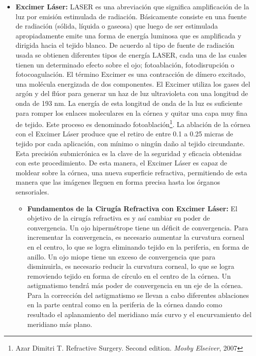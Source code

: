 \begin{itemize}
\begin{enumerate}
    \end{enumerate}  
    \item \textbf{Excimer Láser: }LASER es una abreviación que significa amplificación de la luz por emisión estimulada de radiación. Básicamente consiste en una fuente de radiación (sólida, líquida o gaseosa) que luego de ser estimulada apropiadamente emite una forma de energía luminosa que es amplificada y dirigida hacia el tejido blanco. De acuerdo al tipo de fuente de radiación usada se obtienen diferentes tipos de energía LASER, cada una de las cuales tienen un determinado efecto sobre el ojo; fotoablación, fotodisrupción o fotocoagulación. El término Excimer es una contracción de dímero excitado, una molécula energizada de dos componentes. El Excimer utiliza los gases del argón y del flúor para generar un haz de luz ultravioleta con una longitud de onda de 193 nm. La energía de esta longitud de onda de la luz es suficiente para romper los enlaces moleculares en la córnea y quitar una capa muy fina de tejido. Este proceso es denominado fotoablación\footnote{Azar Dimitri T. Refractive Surgery. Second edition. \textsl{Mosby Elseiver}, 2007}. La ablación de la córnea con el Excimer Láser produce que el retiro de entre 0.1 a 0.25 micras de tejido por cada aplicación, con mínimo o ningún daño al tejido circundante. Esta precisión submicrónica es la clave de la seguridad y eficacia obtenidas con este procedimiento. De esta manera, el Excimer Láser es capaz de moldear sobre la córnea, una nueva superficie refractiva, permitiendo de esta manera que las imágenes lleguen en forma precisa hasta los órganos sensoriales.
    \begin{itemize}
        \item \textbf{Fundamentos de la Cirugía Refractiva con Excimer Láser: }El objetivo de la cirugía refractiva es \textbf{} y así cambiar su poder de convergencia.
        Un ojo hipermétrope tiene un déficit de convergencia. Para incrementar la convergencia, es necesario aumentar la curvatura corneal en el centro, lo que se logra eliminando tejido en la periferia, en forma de anillo.
        Un ojo miope tiene un exceso de convergencia que para disminuirla, es necesario reducir la curvatura corneal, lo que se logra removiendo tejido en forma de círculo en el centro de la córnea.
        Un astigmatismo tendrá más poder de convergencia en un eje de la córnea. Para la corrección del astigmatismo se llevan a cabo diferentes ablaciones en la parte central como en la periferia de la córnea dando como resultado el aplanamiento del meridiano más curvo y el encurvamiento del meridiano más plano. 

\end{itemize}
\end{itemize}
